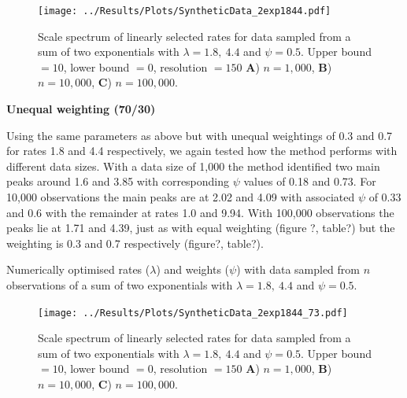 \documentclass[11pt,usenames,dvipsnames,a4paper]{article}
\begin{document}
\begin{figure}[H]
	\centering
	\texttt{[image: ../Results/Plots/SyntheticData\_2exp1844.pdf]}
	\caption{Scale spectrum of linearly selected rates for data sampled from a sum of two exponentials with $\lambda = 1.8,\ 4.4$ and $\psi = 0.5$. Upper bound $= 10$, lower bound $= 0$, resolution $= 150$ \textbf{A}) $n = 1,000$, \textbf{B}) $n = 10,000$,  \textbf{C}) $n = 100,000$.}
\end{figure}

\noindent
\textbf{Unequal weighting (70/30)}
\begin{linenumbers}

Using the same parameters as above but with unequal weightings of 0.3 and 0.7 for rates 1.8 and 4.4 respectively, we again tested how the method performs with different data sizes. With a data size of 1,000 the method identified two main peaks around 1.6 and 3.85 with corresponding $\psi$ values of 0.18 and 0.73. For 10,000 observations the main peaks are at 2.02 and 4.09 with associated $\psi$ of 0.33 and 0.6 with the remainder at rates 1.0 and 9.94. With 100,000 observations the peaks lie at 1.71 and 4.39, just as with equal weighting (figure ?, table?) but the weighting is 0.3 and 0.7 respectively (figure?, table?).
\end{linenumbers}
\begin{table}[H]
	\centering
	\caption{Numerically optimised rates ($\lambda$) and weights ($\psi$) with data sampled from $n$ observations of a sum of two exponentials with $\lambda = 1.8,\ 4.4$ and $\psi = 0.5$.}
	
\end{table}

\begin{figure}[H]
	\centering
	\texttt{[image: ../Results/Plots/SyntheticData\_2exp1844\_73.pdf]}
	\caption{Scale spectrum of linearly selected rates for data sampled from a sum of two exponentials with $\lambda = 1.8,\ 4.4$ and $\psi = 0.5$. Upper bound $= 10$, lower bound $= 0$, resolution $= 150$ \textbf{A}) $n = 1,000$, \textbf{B}) $n = 10,000$,  \textbf{C}) $n = 100,000$.}
\end{figure}
\end{document}

